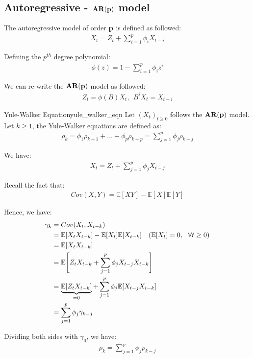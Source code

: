 \subsection{Autoregressive - ${\bf AR(p)}$ model}
\begin{definition}[${\bf AR(p)}$ model]
    The autoregressive model of order $\bf p$ is defined as followed:
    \begin{align*}
        X_{t} = Z_t + \sum_{i=1}^p \phi_i X_{t-i}
    \end{align*}

    \noindent Defining the $p^{th}$ degree polynomial:
    \begin{align*}
        \phi(z) = 1 - \sum_{i=1}^p \phi_i z^i
    \end{align*}

    \noindent We can re-write the $\bf AR(p)$ model as followed:
    \begin{align*}
        Z_t = \phi(B)X_t, \ \ B^i X_t = X_{t-i}
    \end{align*}
\end{definition}

\begin{theorem}{Yule-Walker Equation}{yule_walker_eqn}
    Let $(X_t)_{t\ge0}$ follows the $\bf AR(p)$ model. Let $k\ge1$, the Yule-Walker equations are defined as:
    \begin{align*}
        \rho_k = \phi_1\rho_{k-1} + \dots + \phi_p\rho_{k-p} = \sum_{j=1}^p \phi_j \rho_{k-j}
    \end{align*}
\end{theorem}

\begin{proof*}
    We have:
    \begin{align*}
        X_t = Z_t + \sum_{j=1}^p \phi_j X_{t-j}
    \end{align*}

    \noindent Recall the fact that:
    \begin{align*}
        Cov(X, Y) = \mathbb{E}[XY] - \mathbb{E}[X]\mathbb{E}[Y]
    \end{align*}
    
    \noindent Hence, we have:
    \begin{align*}
        \gamma_k &= Cov(X_t, X_{t-k}) \\
            &= \mathbb{E}[X_tX_{t-k}] - \mathbb{E}[X_t]\mathbb{E}[X_{t-k}] \ \ \ (\mathbb{E}[X_t]=0, \ \ \forall t \ge 0) \\
            &= \mathbb{E}[X_tX_{t-k}] \\
            &= \mathbb{E}\Bigg[
                Z_tX_{t-k} + \sum_{j=1}^p \phi_j X_{t-j} X_{t-k}    
            \Bigg] \\
            &= \underbrace{\mathbb{E}[Z_tX_{t-k}]}_{=0} + \sum_{j=1}^p \phi_j \mathbb{E}[X_{t-j}X_{t-k}] \\
            &= \sum_{j=1}^p \phi_j \gamma_{k-j}
    \end{align*}

    \noindent Dividing both sides with $\gamma_0$, we have:
    \begin{align*}
        \rho_k = \sum_{j=1}^p \phi_j \rho_{k-j}
    \end{align*}
\end{proof*}

